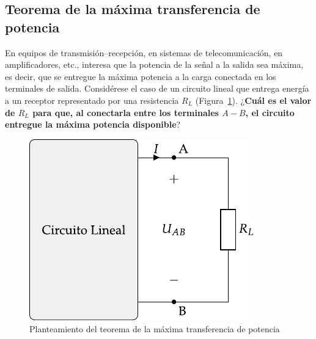 \documentclass[11pt]{book} %
\begin{document}
    
    
    
    

\subsection{Teorema de la máxima transferencia de potencia}
En equipos de transmisión--recepción, en sistemas de telecomunicación, en amplificadores, etc., interesa que la potencia de la señal a la salida sea máxima, es decir, que se entregue la máxima potencia a la carga conectada en los terminales de salida. Considérese el caso de un circuito lineal que entrega energía a un receptor representado por una resistencia $R_L$ (Figura~\ref{fig.planteamiento_mtp_cc}). ¿\textbf{Cuál es el valor de $R_L$ para que, al conectarla entre los terminales $A-B$, el circuito entregue la máxima potencia disponible}?
\begin{figure}[htbp]
    \centering
    \includegraphics[width=0.35\linewidth]{../figs/thevenin_continua_red.pdf}
    \caption{Planteamiento del teorema de la máxima transferencia de potencia}
    \label{fig.planteamiento_mtp_cc}
\end{figure}
\end{document}
